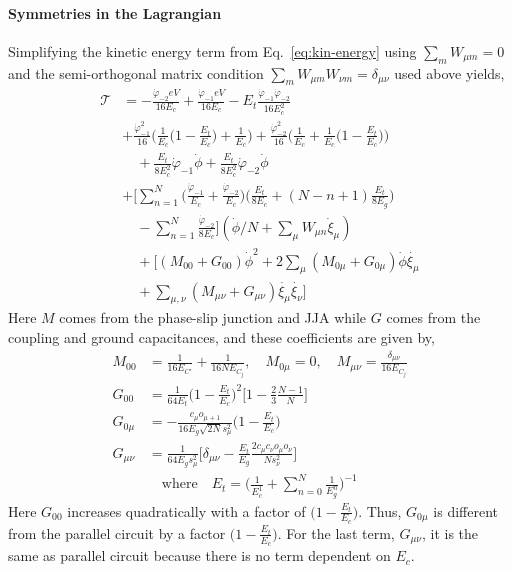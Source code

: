 \documentclass[%
reprint,
superscriptaddress,
 amsmath,amssymb,
 aps,
 prx,
longbibliography,
floatfix,
]{revtex4-2}
\begin{document}
\paragraph{Symmetries in the Lagrangian}
Simplifying the kinetic energy term from Eq.~\ref{eq:kin-energy} using $\sum_m W_{\mu m}=0$ and the semi-orthogonal matrix condition $\sum_m W_{\mu m}W_{\nu m}=\delta_{\mu\nu}$ used above yields,
\begin{align}
\mathcal{T}&=-\frac{\dot{\varphi}_{-2}eV}{16E_c}+\frac{\dot{\varphi}_{-1}eV}{16E_c}-E_t\frac{\dot{\varphi}_{-1}\dot{\varphi}_{-2}}{16E_c^2}\nonumber\\
    &+\frac{\dot{\varphi}^2_{-1}}{16}\Big(\frac{1}{E_c}\Big(1-\frac{E_t}{E_c}\Big)+\frac{1}{E_c}\Big)+\frac{\dot{\varphi}^2_{-2}}{16}\Big(\frac{1}{E_c}+\frac{1}{E_c}\Big(1-\frac{E_t}{E_c}\Big)\Big)\nonumber\\&\quad+\frac{E_t}{8E_c^2}\dot{\varphi}_{-1}\dot{\phi}+\frac{E_t}{8E_c^2}\dot{\varphi}_{-2}\dot{\phi}\nonumber\\
      &+\Big[\sum_{n=1}^N\Big(\frac{\dot{\varphi}_{-1}}{E_c}+\frac{\dot{\varphi}_{-2}}{E_c}\Big)\Big(\frac{E_t}{8E_c}+(N-n+1)\frac{E_t}{8E_g}\Big)\nonumber\\&\quad-\sum_{n=1}^N\frac{\dot{\varphi}_{-2}}{8E_c}\Big](\dot{\phi}/N+\sum_\mu W_{\mu n}\dot{\xi}_\mu)\nonumber\\
    &\quad+\Big[(M_{00}+G_{00})\dot{\phi}^2+2\sum_{\mu}(M_{0\mu}+G_{0\mu})\dot{\phi}\dot{\xi_\mu}\nonumber\\&\quad+\sum_{\mu,\nu}(M_{\mu\nu}+G_{\mu\nu})\dot{\xi_\mu}\dot{\xi_\nu}\Big]    
    \end{align}
    Here $M$ comes from the phase-slip junction and JJA while $G$ comes from the coupling and ground capacitances, and these coefficients are given by,
    \begin{align}
    M_{00}&=\frac{1}{16E_{C'}}+\frac{1}{16NE_{C_j}},\quad M_{0\mu}=0,\quad    M_{\mu\nu}=\frac{\delta_{\mu\nu}}{16E_{C_j}}\\
    G_{00}&=\frac{1}{64E_t}\Big(1-\frac{E_t}{E_c}\Big)^2\Big[1-\frac{2}{3}\frac{N-1}{N}\Big]\\
    G_{0\mu}&=-\frac{c_\mu o_{\mu+1}}{16E_g\sqrt{2N}s_\mu^2}\Big(1-\frac{E_t}{E_c}\Big)\\
    G_{\mu\nu}&=\frac{1}{64E_gs_\mu^2}\Big[\delta_{\mu\nu}-\frac{E_t}{E_g}\frac{2c_\mu c_\nu o_\mu o_\nu}{N s_\nu^2}\Big]\\&\quad\text{where}\quad E_t=\Big(\frac{1}{E_c^1}+\sum_{n=0}^N\frac{1}{E^n_g}\Big)^{-1}\nonumber
\end{align}
Here $G_{00}$ increases quadratically with a factor of $\Big(1-\frac{E_t}{E_c}\Big)$. Thus, $G_{0\mu}$ is different from the parallel circuit by a factor $\Big(1-\frac{E_t}{E_c}\Big)$. 
For the last term, $G_{\mu\nu}$, it is the same as parallel circuit because there is no term dependent on $E_c$. 
\end{document}
